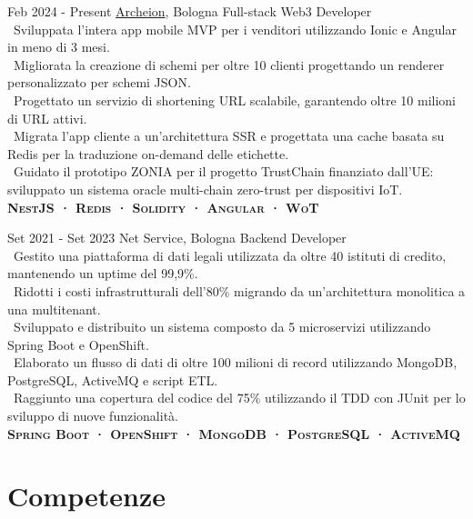 \documentclass{tccv}
\begin{document}
\begin{eventlist}

     \item{Feb 2024 - Present}
     {\href{https://archeion.tech/}{Archeion}, Bologna}
     {Full-stack Web3 Developer} \\
     \textbullet~Sviluppata l'intera app mobile MVP per i venditori utilizzando Ionic e Angular in meno di 3 mesi. \\
     \textbullet~Migliorata la creazione di schemi per oltre 10 clienti progettando un renderer personalizzato per schemi JSON. \\
     \textbullet~Progettato un servizio di shortening URL scalabile, garantendo oltre 10 milioni di URL attivi. \\
     \textbullet~Migrata l'app cliente a un'architettura SSR e progettata una cache basata su Redis per la traduzione on-demand delle etichette. \\
     \textbullet~Guidato il prototipo ZONIA per il progetto TrustChain finanziato dall'UE: sviluppato un sistema oracle multi-chain zero-trust per dispositivi IoT. \\
     \textbf{\textsc{NestJS · Redis · Solidity · Angular · WoT}}

     \item{Set 2021 - Set 2023}
     {Net Service, Bologna}
     {Backend Developer} \\
     \textbullet~Gestito una piattaforma di dati legali utilizzata da oltre 40 istituti di credito, mantenendo un uptime del 99,9\%. \\
     \textbullet~Ridotti i costi infrastrutturali dell'80\% migrando da un'architettura monolitica a una multitenant. \\
     \textbullet~Sviluppato e distribuito un sistema composto da 5 microservizi utilizzando Spring Boot e OpenShift. \\
     \textbullet~Elaborato un flusso di dati di oltre 100 milioni di record utilizzando MongoDB, PostgreSQL, ActiveMQ e script ETL. \\
     \textbullet~Raggiunto una copertura del codice del 75\% utilizzando il TDD con JUnit per lo sviluppo di nuove funzionalità. \\
     \textbf{\textsc{Spring Boot · OpenShift · MongoDB · PostgreSQL · ActiveMQ}}

\end{eventlist}

\section{Competenze}
\end{document}
